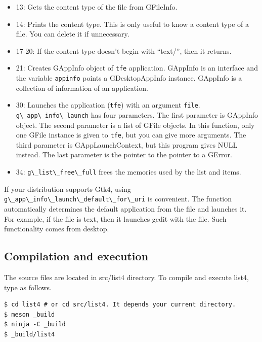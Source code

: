 \begin{itemize}
\tightlist
\item
  13: Gets the content type of the file from GFileInfo.
\item
  14: Prints the content type. This is only useful to know a content
  type of a file. You can delete it if unnecessary.
\item
  17-20: If the content type doesn't begin with ``text/'', then it
  returns.
\item
  21: Creates GAppInfo object of \passthrough{\lstinline!tfe!}
  application. GAppInfo is an interface and the variable
  \passthrough{\lstinline!appinfo!} points a GDesktopAppInfo instance.
  GAppInfo is a collection of information of an application.
\item
  30: Launches the application (\passthrough{\lstinline!tfe!}) with an
  argument \passthrough{\lstinline!file!}.
  \passthrough{\lstinline!g\_app\_info\_launch!} has four parameters.
  The first parameter is GAppInfo object. The second parameter is a list
  of GFile objects. In this function, only one GFile instance is given
  to \passthrough{\lstinline!tfe!}, but you can give more arguments. The
  third parameter is GAppLaunchContext, but this program gives NULL
  instead. The last parameter is the pointer to the pointer to a GError.
\item
  34: \passthrough{\lstinline!g\_list\_free\_full!} frees the memories
  used by the list and items.
\end{itemize}

If your distribution supports Gtk4, using
\passthrough{\lstinline!g\_app\_info\_launch\_default\_for\_uri!} is
convenient. The function automatically determines the default
application from the file and launches it. For example, if the file is
text, then it launches gedit with the file. Such functionality comes
from desktop.

\hypertarget{compilation-and-execution}{%
\subsection{Compilation and execution}\label{compilation-and-execution}}

The source files are located in src/list4 directory. To compile and
execute list4, type as follows.

\begin{lstlisting}
$ cd list4 # or cd src/list4. It depends your current directory.
$ meson _build
$ ninja -C _build
$ _build/list4
\end{lstlisting}

